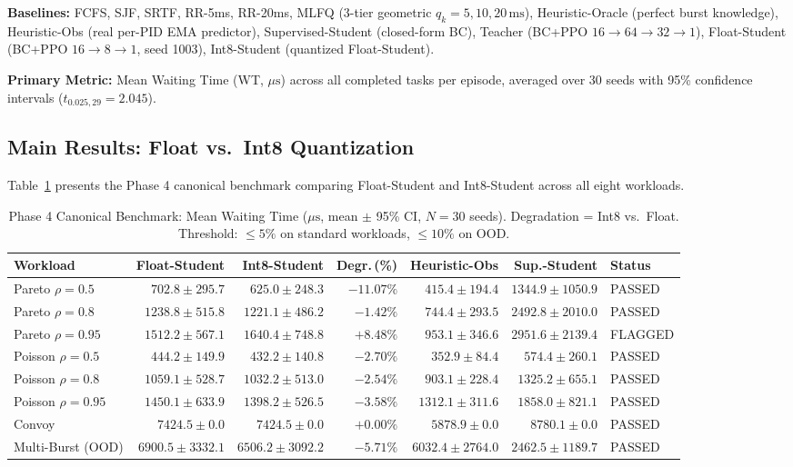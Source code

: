 \textbf{Baselines:} FCFS, SJF, SRTF, RR-5ms, RR-20ms, MLFQ (3-tier geometric
$q_k = 5, 10, 20\,\text{ms}$), Heuristic-Oracle (perfect burst knowledge),
Heuristic-Obs (real per-PID EMA predictor), Supervised-Student (closed-form
BC), Teacher (BC+PPO $16\to 64\to 32\to 1$), Float-Student
(BC+PPO $16\to 8\to 1$, seed 1003), Int8-Student (quantized Float-Student).

\textbf{Primary Metric:} Mean Waiting Time (WT, $\mu\text{s}$) across all
completed tasks per episode, averaged over 30 seeds with 95\% confidence
intervals ($t_{0.025,29} = 2.045$).

\subsection{Main Results: Float vs.\ Int8 Quantization}
\label{subsec:main_results}

Table~\ref{tab:phase4} presents the Phase 4 canonical benchmark comparing
Float-Student and Int8-Student across all eight workloads.

\begin{table}[t]
  \centering
  \caption{Phase 4 Canonical Benchmark: Mean Waiting Time ($\mu\text{s}$,
    mean $\pm$ 95\% CI, $N = 30$ seeds). Degradation = Int8 vs.\ Float.
    Threshold: $\le 5\%$ on standard workloads, $\le 10\%$ on OOD.}
  \label{tab:phase4}
  \small
  \begin{tabular}{lrrrrrl}
    \toprule
    \textbf{Workload} & \textbf{Float-Student} & \textbf{Int8-Student}
      & \textbf{Degr.\,(\%)} & \textbf{Heuristic-Obs} & \textbf{Sup.-Student} & \textbf{Status} \\
    \midrule
    Pareto $\rho = 0.5$  & $702.8\pm295.7$   & $625.0\pm248.3$    & $-11.07\%$ & $415.4\pm194.4$   & $1344.9\pm1050.9$ & PASSED \\
    Pareto $\rho = 0.8$  & $1238.8\pm515.8$  & $1221.1\pm486.2$   & $-1.42\%$  & $744.4\pm293.5$   & $2492.8\pm2010.0$ & PASSED \\
    Pareto $\rho = 0.95$ & $1512.2\pm567.1$  & $1640.4\pm748.8$   & $+8.48\%$  & $953.1\pm346.6$   & $2951.6\pm2139.4$ & FLAGGED \\
    Poisson $\rho = 0.5$ & $444.2\pm149.9$   & $432.2\pm140.8$    & $-2.70\%$  & $352.9\pm84.4$    & $574.4\pm260.1$   & PASSED \\
    Poisson $\rho = 0.8$ & $1059.1\pm528.7$  & $1032.2\pm513.0$   & $-2.54\%$  & $903.1\pm228.4$   & $1325.2\pm655.1$  & PASSED \\
    Poisson $\rho = 0.95$& $1450.1\pm633.9$  & $1398.2\pm526.5$   & $-3.58\%$  & $1312.1\pm311.6$  & $1858.0\pm821.1$  & PASSED \\
    Convoy               & $7424.5\pm0.0$    & $7424.5\pm0.0$     & $+0.00\%$  & $5878.9\pm0.0$    & $8780.1\pm0.0$    & PASSED \\
    Multi-Burst (OOD)    & $6900.5\pm3332.1$ & $6506.2\pm3092.2$  & $-5.71\%$  & $6032.4\pm2764.0$ & $2462.5\pm1189.7$ & PASSED \\
    \bottomrule
  \end{tabular}
\end{table}

